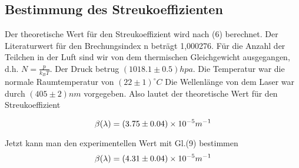 \subsection{Bestimmung des Streukoeffizienten}

Der theoretische Wert für den Streukoeffizient wird nach (6) berechnet. Der Literaturwert für den Brechungsindex n beträgt 1,000276. Für die Anzahl der Teilchen in der Luft sind wir von dem thermischen Gleichgewicht ausgegangen, d.h. $N = \frac{p}{k_B T}$. Der Druck betrug $(1018.1 \pm 0.5)hpa$. Die Temperatur war die normale Raumtemperatur von $(22 \pm 1)^{\circ}C$ Die Wellenlänge von dem Laser war durch $(405 \pm 2)nm$ vorgegeben. Also lautet der theoretische Wert für den Streukoeffizient

\begin{equation}
\notag
\beta(\lambda)= (3.75 \pm 0.04) \times 10^{-5} m^{-1}
\end{equation}

Jetzt kann man den experimentellen Wert mit Gl.(9) bestimmen
\begin{equation}
\notag
\beta(\lambda)= (4.31 \pm 0.04) \times 10^{-5} m^{-1}
\end{equation} 




